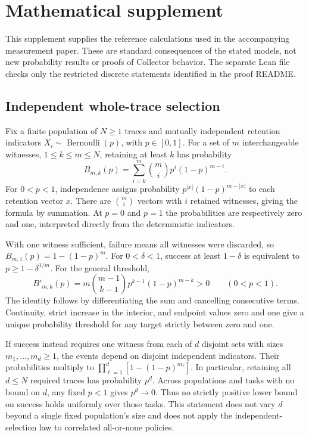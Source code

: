 \section{Mathematical supplement}\label{app:mathematical-supplement}
\noindent This supplement supplies the reference calculations used in the accompanying measurement paper. These are standard consequences of the stated models, not new probability results or proofs of Collector behavior. The separate Lean file checks only the restricted discrete statements identified in the proof README.

\subsection{Independent whole-trace selection}
Fix a finite population of $N\ge1$ traces and mutually independent retention indicators $X_i\sim\operatorname{Bernoulli}(p)$, with $p\in[0,1]$. For a set of $m$ interchangeable witnesses, $1\le k\le m\le N$, retaining at least $k$ has probability
\begin{equation}\label{eq:supplement-binomial}
B_{m,k}(p)=\sum_{i=k}^{m}\binom mi p^i(1-p)^{m-i}.
\end{equation}
For $0<p<1$, independence assigns probability $p^{|x|}(1-p)^{m-|x|}$ to each retention vector $x$. There are $\binom mi$ vectors with $i$ retained witnesses, giving the formula by summation. At $p=0$ and $p=1$ the probabilities are respectively zero and one, interpreted directly from the deterministic indicators.

With one witness sufficient, failure means all witnesses were discarded, so $B_{m,1}(p)=1-(1-p)^m$. For $0<\delta<1$, success at least $1-\delta$ is equivalent to $p\ge1-\delta^{1/m}$. For the general threshold,
\[
B'_{m,k}(p)=m\binom{m-1}{k-1}p^{k-1}(1-p)^{m-k}>0\qquad(0<p<1).
\]
The identity follows by differentiating the sum and cancelling consecutive terms. Continuity, strict increase in the interior, and endpoint values zero and one give a unique probability threshold for any target strictly between zero and one.

If success instead requires one witness from each of $d$ disjoint sets with sizes $m_1,\ldots,m_d\ge1$, the events depend on disjoint independent indicators. Their probabilities multiply to $\prod_{\ell=1}^{d}[1-(1-p)^{m_\ell}]$. In particular, retaining all $d\le N$ required traces has probability $p^d$. Across populations and tasks with no bound on $d$, any fixed $p<1$ gives $p^d\to0$. Thus no strictly positive lower bound on success holds uniformly over those tasks. This statement does not vary $d$ beyond a single fixed population's size and does not apply the independent-selection law to correlated all-or-none policies.

